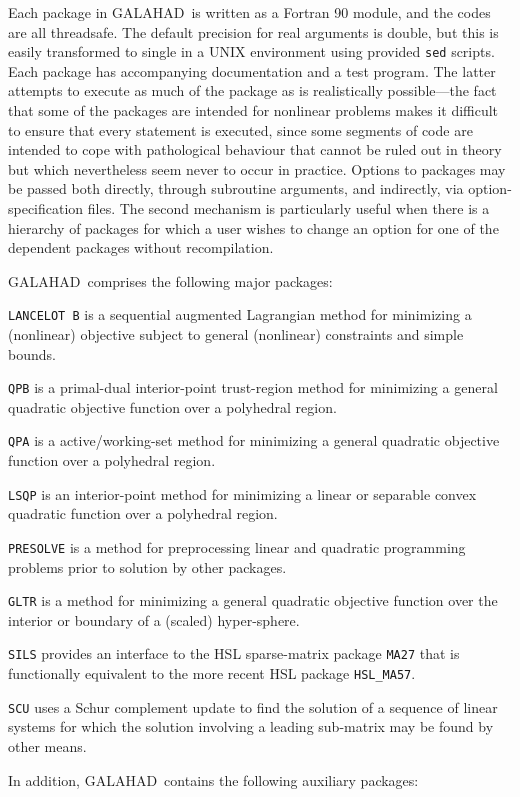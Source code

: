 \documentclass[twoside]{article}
\newcommand{\gal}{{\sf GALAHAD}}
\renewcommand{\itt}[1]{\item{{\tt #1}}}
\begin{document}
Each package in \gal\ is written as a Fortran 90 module, and the codes
are all threadsafe. The default
precision for real arguments is double, but this is easily transformed
to single in a UNIX environment using provided {\tt sed} scripts.
Each package has accompanying
documentation and a test program. The latter attempts to execute as
much of the package as
is realistically possible---the fact that some of the packages are
intended for nonlinear problems makes it difficult to ensure that
every statement is executed, since some segments of code are
intended to cope with pathological behaviour that cannot be ruled out
in theory but which nevertheless seem never to occur in practice.
Options to packages may be passed both directly, through subroutine arguments,
and indirectly, via option-specification files. The second mechanism is
particularly useful when there is a hierarchy of packages for which
a user wishes to change an option for one of the dependent packages without
recompilation.


\gal\ comprises the following major packages:

\begin{description}

\itt{LANCELOT B} is a sequential augmented Lagrangian method for
minimizing a (nonlinear) objective subject to general (nonlinear) constraints
and simple bounds.

\itt{QPB} is a primal-dual interior-point trust-region method for
minimizing a general quadratic objective function over a polyhedral region.

\itt{QPA} is a active/working-set method for
minimizing a general quadratic objective function over a polyhedral region.

\itt{LSQP} is an interior-point method for minimizing a linear or
separable convex quadratic function over a polyhedral region.

\itt{PRESOLVE} is a method for preprocessing linear and quadratic programming
problems prior to solution by other packages.

\itt{GLTR} is a method for minimizing a general quadratic objective function
over the interior or boundary of a (scaled) hyper-sphere.

\itt{SILS} provides an interface to the HSL sparse-matrix package {\tt MA27}
that is functionally equivalent to the more recent HSL package {\tt HSL\_MA57}.

\itt{SCU} uses a Schur complement update to find the solution of
a sequence of linear systems for which the solution
involving a leading sub-matrix may be found by other means.

\end{description}
In addition, \gal\ contains the following auxiliary packages:
\end{document}
